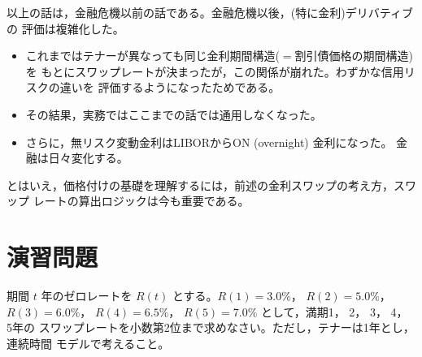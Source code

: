 \begin{remark}[金融危機以後の注意]
以上の話は，金融危機以前の話である。金融危機以後，(特に金利)デリバティブの
評価は複雑化した。
\begin{itemize}
\item これまではテナーが異なっても同じ金利期間構造($=$割引債価格の期間構造)を
もとにスワップレートが決まったが，この関係が崩れた。わずかな信用リスクの違いを
評価するようになったためである。
\item その結果，実務ではここまでの話では通用しなくなった。
\item さらに，無リスク変動金利はLIBORからON (overnight) 金利になった。
金融は日々変化する。
\end{itemize}
とはいえ，価格付けの基礎を理解するには，前述の金利スワップの考え方，スワップ
レートの算出ロジックは今も重要である。
\end{remark}

\section{演習問題}

\begin{exercise}[問題1]
期間 $t$ 年のゼロレートを $R(t)$ とする。$R(1)=3.0\%$， $R(2)=5.0\%$，
$R(3)=6.0\%$， $R(4)=6.5\%$， $R(5)=7.0\%$ として，満期1， 2， 3， 4， 5年の
スワップレートを小数第2位まで求めなさい。ただし，テナーは1年とし，連続時間
モデルで考えること。
\end{exercise}

